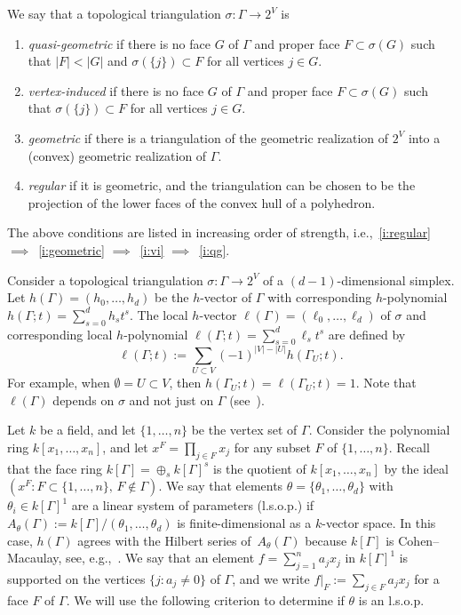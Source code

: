 \documentclass[11pt]{article}
\theoremstyle{definition}
\numberwithin{equation}{section}
\numberwithin{equation}{section}
\begin{document}
We say that a topological triangulation $\sigma \colon \Gamma \to 2^V$ is 
\begin{enumerate}
\item\label{i:qg} \emph{quasi-geometric} if there is no face $G$ of $\Gamma$ and proper face $F \subset \sigma(G)$
such that $|F| < |G|$ and $\sigma(\{ j\}) \subset F$ for all vertices $j \in G$. 

\item\label{i:vi} \emph{vertex-induced}  
if there is no face $G$ of $\Gamma$ and proper face $F \subset \sigma(G)$ such that $\sigma(\{ j\}) \subset F$ for all vertices $j \in G$. 

\item\label{i:geometric} \emph{geometric} if there is a triangulation of the geometric realization of $2^V$ into a (convex) geometric realization of $\Gamma$. 

\item\label{i:regular} \emph{regular} if it is geometric, and the triangulation can be chosen to be the projection of the lower faces of the convex hull of a polyhedron. 
\end{enumerate}
The above conditions are listed in increasing order of strength, i.e.,~\eqref{i:regular} $\implies$~\eqref{i:geometric} $\implies$~\eqref{i:vi} $\implies$~\eqref{i:qg}. 

Consider a topological triangulation $\sigma \colon \Gamma \to 2^V$ of a $(d - 1)$-dimensional simplex. Let $h(\Gamma) = (h_0,\ldots,h_d)$ be the $h$-vector of $\Gamma$ with corresponding $h$-polynomial $h(\Gamma;t) = \sum_{s = 0}^d h_s t^s$. 
The local $h$-vector $\ell(\Gamma) = (\ell_0,\ldots,\ell_d)$ of $\sigma$ and corresponding local $h$-polynomial $\ell(\Gamma;t) = \sum_{s = 0}^d \ell_s t^s$
are defined by 
\begin{equation}\label{eq:localh}
\ell(\Gamma;t) := \sum_{U \subset V} (-1)^{|V| - |U|} h(\Gamma_U;t). 
\end{equation}
For example, when $\emptyset = U \subset V$, then $h(\Gamma_U;t) = \ell(\Gamma_U;t) = 1$. Note that  $\ell(\Gamma)$ depends on $\sigma$ and not just on $\Gamma$ (see~\cite[Example~2.3e]{Stanleylocalh}). 

Let $k$ be a field, and let $\{ 1, \ldots, n \}$ be the vertex set of $\Gamma$. Consider the polynomial ring $k[x_1,\ldots,x_n]$, and let $x^F = \prod_{j \in F} x_j$ for any subset $F$ of $\{ 1, \ldots, n \}$. 
Recall that the face ring $k[\Gamma] = \oplus_s k[\Gamma]^s$ 
is the quotient of $k[x_1,\ldots,x_n]$ by the ideal \mbox{$(x^F : F \subset \{ 1, \ldots, n \}, \, F \notin \Gamma )$}. 
We say that elements $ \theta = \{ \theta_1,\ldots,\theta_d \}$ with $\theta_i \in k[\Gamma]^1$ are a linear system of parameters (l.s.o.p.) if $A_\theta(\Gamma) := k[\Gamma]/(\theta_1, \dotsc, \theta_d)$ is finite-dimensional as a $k$-vector space. In this case, $h(\Gamma)$ agrees with the Hilbert series of~$A_\theta(\Gamma)$ because 
$k[\Gamma]$
is Cohen--Macaulay, see, e.g.,~\cite[pg. 61]{Stanleybook}. 
We say that an element $f = \sum_{j = 1}^n a_j x_j$ in $k[\Gamma]^1$ is supported on the vertices $\{ j : a_j \neq 0 \}$ of $\Gamma$, and we write $f|_F := \sum_{j \in F} a_j x_j$ for a face $F$ of $\Gamma$. We will use the following criterion to determine if $\theta$ is an l.s.o.p. 
\end{document}
